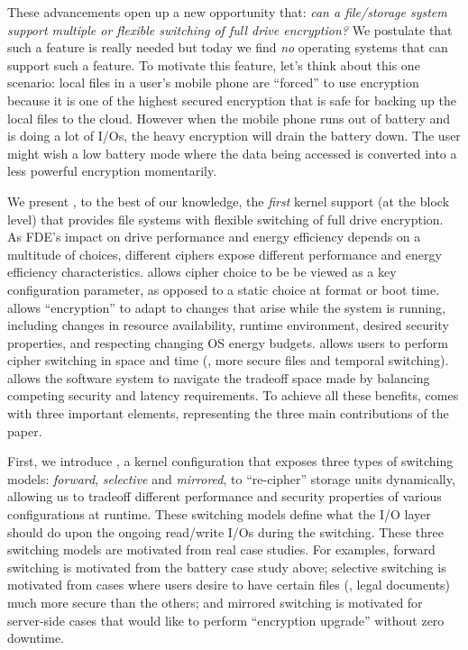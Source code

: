 These advancements open up a new opportunity that: {\em can a file/storage
system support multiple or flexible switching of full drive encryption?} We
postulate that such a feature is really needed but today we find {\em no}
operating systems that can support such a feature. To motivate this feature,
let's think about this one scenario: local files in a user's mobile phone are
``forced'' to use encryption \encA because it is one of the highest secured
encryption that is safe for backing up the local files to the cloud. However
when the mobile phone runs out of battery and is doing a lot of I/Os, the heavy
encryption will drain the battery down. The user might wish a low battery mode
where the data being accessed is converted into a less powerful encryption
momentarily.


We present \sys, to the best of our knowledge, the {\em first} kernel support
(at the block level) that provides file systems with flexible switching of full
drive encryption. As FDE's impact on drive performance and energy efficiency
depends on a multitude of choices, different ciphers expose different
performance and energy efficiency characteristics. \sys allows cipher choice to
be be viewed as a key configuration parameter, as opposed to a static choice at
format or boot time. \sys allows ``encryption'' to adapt to changes that arise
while the system is running, including changes in resource availability, runtime
environment, desired security properties, and respecting changing OS energy
budgets. \sys allows users to perform cipher switching in space and time (\eg,
more secure files and temporal switching). \sys allows the software system to
navigate the tradeoff space made by balancing competing security and latency
requirements.  To achieve all these benefits, \sys comes with three important
elements, representing the three main contributions of the paper.

First, we introduce \sysA, a kernel configuration that exposes three types of
switching models: {\em forward}, {\em selective} and {\em mirrored}, to
``re-cipher'' storage units dynamically, allowing us to tradeoff different
performance and security properties of various configurations at runtime. These
switching models define what the I/O layer should do upon the ongoing read/write
I/Os during the switching. These three switching models are motivated from real
case studies. For examples, forward switching is motivated from the battery case
study above; selective switching is motivated from cases where users desire to
have certain files (\eg, legal documents) much more secure than the others; and
mirrored switching is motivated for server-side cases that would like to perform
``encryption upgrade'' without zero downtime.

